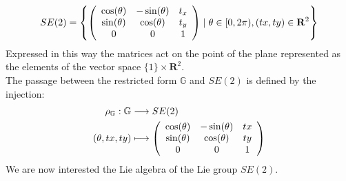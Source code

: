 \begin{align*}
SE(2) = 
\left \{
\left (
\begin{array} {c c c }
\cos(\theta) & - \sin(\theta)& t_{x} \\
\sin(\theta) & \cos(\theta) & t_{y}\\
0 & 0 &  1
\end{array}
\right )
\mid
\theta \in  [0, 2\pi), (tx, ty) \in\mathbf{R}^2
\right \}
\end{align*}
Expressed in this way the matrices act on the point of the plane represented as the elements of the vector space $\{1 \} \times \mathbf{R}^2$.\\ 
The passage between the restricted form $\mathbb{G} $ and $SE(2)$ is defined by the injection:
\begin{align*}
\rho_{\mathbb{G}} : \mathbb{G} &\longrightarrow   SE(2)\\
(\theta, tx, ty) 
& \longmapsto
\left (
\begin{array} {c c c }
\cos(\theta) & - \sin(\theta)& tx \\
\sin(\theta) & \cos(\theta) & ty\\
0 & 0 &  1
\end{array}
\right )
\end{align*}
We are now interested the Lie algebra of the Lie group $SE(2)$. 
